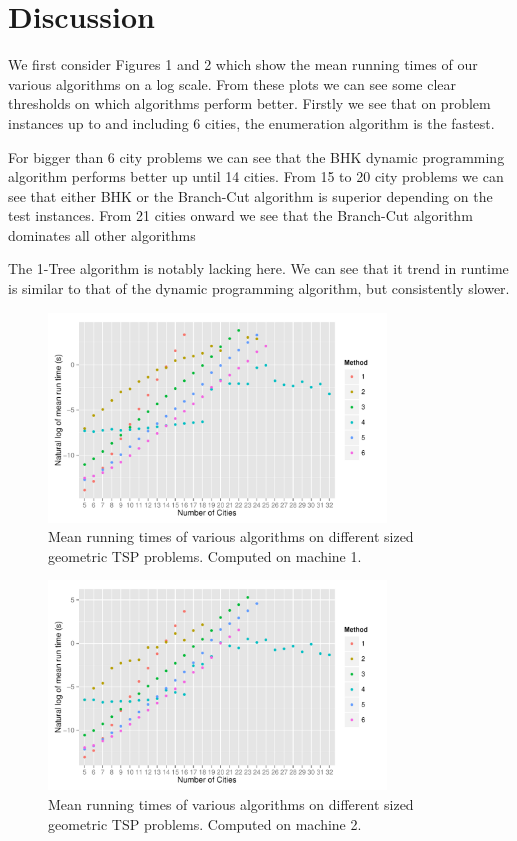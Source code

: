 \documentclass[11pt]{article}
\begin{document}
	
	
	\section{Discussion}
	\label{sec:discussion}
	We first consider Figures 1 and 2 which show the mean running times of our various algorithms on a log scale. From these plots we can see some clear thresholds on which algorithms perform better. Firstly we see that on problem instances up to and including 6 cities, the enumeration algorithm is the fastest.
	
	For bigger than 6 city problems we can see that the BHK dynamic programming algorithm performs better up until 14 cities. From 15 to 20 city problems we can see that either BHK or the Branch-Cut algorithm is superior depending on the test instances. From 21 cities onward we see that the Branch-Cut algorithm dominates all other algorithms
	
	The 1-Tree algorithm is notably lacking here. We can see that it trend in runtime is similar to that of the dynamic programming algorithm, but consistently slower.
	
	\begin{figure}[H]
		\center
		\includegraphics[width=0.8\textwidth]{s1-log}
		\caption{Mean running times of various algorithms on different sized geometric TSP problems. Computed on machine 1.}
		\label{fig:m1-runtime}
	\end{figure}
	
	\begin{figure}[H]
		\center
		\includegraphics[width=0.8\textwidth]{b40-log}
		\caption{Mean running times of various algorithms on different sized geometric TSP problems. Computed on machine 2.}
		\label{fig:m2-runtime}
	\end{figure}
	
\end{document}
